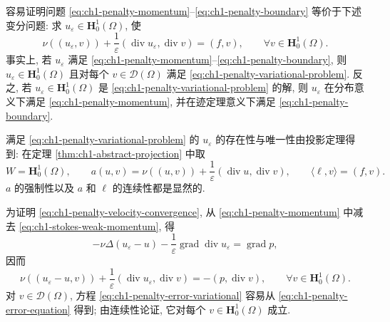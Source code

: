 \begin{Proof}
容易证明问题 \eqref{eq:ch1-penalty-momentum}--\eqref{eq:ch1-penalty-boundary} 等价于下述变分问题: 求 $u_\varepsilon\in\mathbf H_0^1(\Omega)$, 使
\begin{equation}
\nu((u_\varepsilon,v))
+\frac{1}{\varepsilon}(\operatorname{div}u_\varepsilon,\operatorname{div}v)
=(f,v),
\qquad\forall v\in\mathbf H_0^1(\Omega).
\label{eq:ch1-penalty-variational-problem}
\end{equation}
事实上, 若 $u_\varepsilon$ 满足 \eqref{eq:ch1-penalty-momentum}--\eqref{eq:ch1-penalty-boundary}, 则 $u_\varepsilon\in\mathbf H_0^1(\Omega)$ 且对每个 $v\in\mathcal D(\Omega)$ 满足 \eqref{eq:ch1-penalty-variational-problem}. 反之, 若 $u_\varepsilon\in\mathbf H_0^1(\Omega)$ 是 \eqref{eq:ch1-penalty-variational-problem} 的解, 则 $u_\varepsilon$ 在分布意义下满足 \eqref{eq:ch1-penalty-momentum}, 并在迹定理意义下满足 \eqref{eq:ch1-penalty-boundary}.

满足 \eqref{eq:ch1-penalty-variational-problem} 的 $u_\varepsilon$ 的存在性与唯一性由投影定理得到: 在定理 \ref{thm:ch1-abstract-projection} 中取
\[
W=\mathbf H_0^1(\Omega),
\qquad a(u,v)=\nu((u,v))+\frac{1}{\varepsilon}(\operatorname{div}u,\operatorname{div}v),
\qquad \langle\ell,v\rangle=(f,v).
\]
$a$ 的强制性以及 $a$ 和 $\ell$ 的连续性都是显然的.

为证明 \eqref{eq:ch1-penalty-velocity-convergence}, 从 \eqref{eq:ch1-penalty-momentum} 中减去 \eqref{eq:ch1-stokes-weak-momentum}, 得
\begin{equation}
-\nu\Delta(u_\varepsilon-u)
-\frac{1}{\varepsilon}\operatorname{grad}\operatorname{div}u_\varepsilon
=\operatorname{grad}p,
\label{eq:ch1-penalty-error-equation}
\end{equation}
因而
\begin{equation}
\nu((u_\varepsilon-u,v))
+\frac{1}{\varepsilon}(\operatorname{div}u_\varepsilon,\operatorname{div}v)
=-(p,\operatorname{div}v),
\qquad\forall v\in\mathbf H_0^1(\Omega).
\label{eq:ch1-penalty-error-variational}
\end{equation}
对 $v\in\mathcal D(\Omega)$, 方程 \eqref{eq:ch1-penalty-error-variational} 容易从 \eqref{eq:ch1-penalty-error-equation} 得到; 由连续性论证, 它对每个 $v\in\mathbf H_0^1(\Omega)$ 成立.


\end{Proof}
